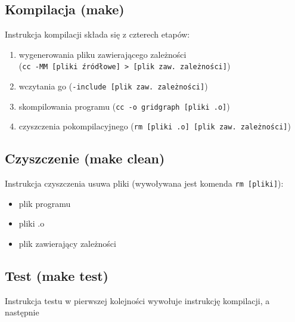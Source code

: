 \documentclass[11pt,a4paper]{report}
\begin{document}
    \subsection{Kompilacja (make)}
    Instrukcja kompilacji składa się z czterech etapów:
    \begin{enumerate}
        \item wygenerowania pliku zawierającego zależności\\
              (\verb|cc -MM [pliki źródłowe] > [plik zaw. zależności]|)
        \item wczytania go (\verb|-include [plik zaw. zależności]|)
        \item skompilowania programu (\verb|cc -o gridgraph [pliki .o]|)
        \item czyszczenia pokompilacyjnego (\verb|rm [pliki .o] [plik zaw. zależności]|)
    \end{enumerate}
    \subsection{Czyszczenie (make clean)}
    Instrukcja czyszczenia usuwa pliki (wywoływana jest komenda \verb|rm [pliki]|):
    \begin{itemize}
        \item plik programu
        \item pliki .o
        \item plik zawierający zależności
    \end{itemize}
    \subsection{Test (make test)}
    Instrukcja testu w pierwszej kolejności wywołuje instrukcję kompilacji, a następnie
\end{document}
